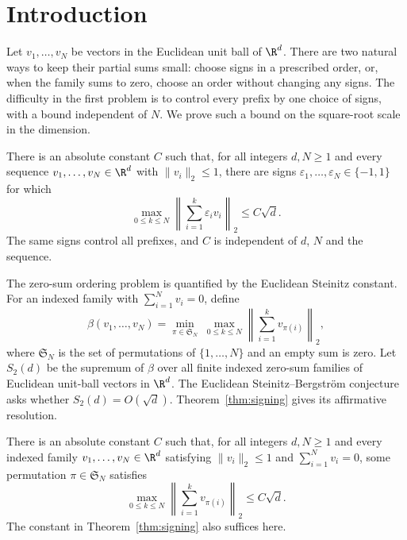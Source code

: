 \section{Introduction}

Let $v_1,\ldots,v_N$ be vectors in the Euclidean unit ball of $\R^d$.
There are two natural ways to keep their partial sums small: choose signs
in a prescribed order, or, when the family sums to zero, choose an order
without changing any signs. The difficulty in the first problem is to
control every prefix by one choice of signs, with a bound independent of
$N$. We prove such a bound on the square-root scale in the dimension.

\begin{theorem}\label{thm:signing}
There is an absolute constant $C$ such that, for all integers $d,N\ge1$ and
every sequence $v_1,\ldots,v_N\in\R^d$ with $\lVert v_i\rVert_2\le1$,
there are signs $\varepsilon_1,\ldots,\varepsilon_N\in\{-1,1\}$ for which
\[
 \max_{0\le k\le N}
 \left\lVert\sum_{i=1}^k\varepsilon_i v_i\right\rVert_2\le C\sqrt d.
\]
The same signs control all prefixes, and $C$ is independent of $d$, $N$
and the sequence.
\end{theorem}

The zero-sum ordering problem is quantified by the Euclidean Steinitz
constant. For an indexed family with $\sum_{i=1}^N v_i=0$, define
\[
 \beta(v_1,\ldots,v_N)
 =\min_{\pi\in\mathfrak S_N}\;
   \max_{0\le k\le N}\left\lVert\sum_{i=1}^k v_{\pi(i)}\right\rVert_2,
\]
where $\mathfrak S_N$ is the set of permutations of $\{1,\ldots,N\}$
and an empty sum is zero. Let $S_2(d)$ be the supremum of $\beta$ over
all finite indexed zero-sum families of Euclidean unit-ball vectors in
$\R^d$. The Euclidean Steinitz--Bergstr\"om conjecture asks whether
$S_2(d)=O(\sqrt d)$. Theorem~\ref{thm:signing} gives its affirmative resolution.

\begin{theorem}\label{thm:steinitz}
There is an absolute constant $C$ such that, for all integers $d,N\ge1$ and
every indexed family $v_1,\ldots,v_N\in\R^d$ satisfying
$\lVert v_i\rVert_2\le1$ and $\sum_{i=1}^N v_i=0$, some permutation
$\pi\in\mathfrak S_N$ satisfies
\[
 \max_{0\le k\le N}\left\lVert\sum_{i=1}^k v_{\pi(i)}\right\rVert_2
 \le C\sqrt d.
\]
The constant in Theorem~\ref{thm:signing} also suffices here.
\end{theorem}

